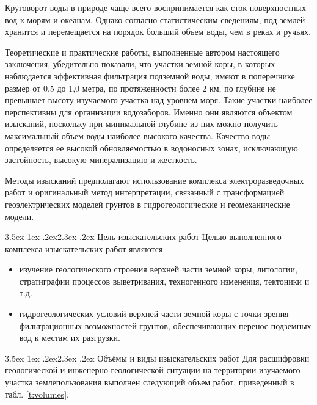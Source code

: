 \documentclass[a4paper,12pt]{article} %
\makeatletter
\renewcommand\section{\@startsection {section}{1}{\parindent}%
	{3.5ex \@plus 1ex \@minus .2ex}{2.3ex \@plus.2ex}%
	{\normalfont\hyphenpenalty=10000\Large\bfseries}}
\makeatother
\begin{document}
Круговорот воды в природе чаще всего воспринимается как сток поверхностных вод к морям и океанам. Однако согласно статистическим сведениям, под землей хранится и перемещается на порядок больший объем воды, чем в реках и ручьях.

Теоретические и практические работы, выполненные автором настоящего заключения, убедительно показали, что участки земной коры, в которых наблюдается эффективная фильтрация подземной воды, имеют в поперечнике размер от 0,5 до 1,0 метра, по протяженности более 2 км, по глубине не превышает высоту изучаемого участка над уровнем моря. Такие участки наиболее перспективны для организации водозаборов. Именно они являются объектом изысканий, поскольку при минимальной глубине из них можно получить максимальный объем воды наиболее высокого качества. Качество воды определяется ее высокой обновляемостью в водоносных зонах, исключающую застойность, высокую минерализацию и жесткость.

Методы изысканий предполагают использование комплекса электроразведочных работ и оригинальный метод интерпретации, связанный с трансформацией геоэлектрических моделей грунтов в гидрогеологические и геомеханические модели.

\section{Цель изыскательских работ}
Целью выполненного комплекса изыскательских работ являются:
\begin{itemize}
	\item изучение геологического строения верхней части земной коры, литологии, стратиграфии процессов выветривания, техногенного изменения, тектоники и т.д.
	\item гидрогеологических условий верхней части земной коры с точки зрения фильтрационных возможностей грунтов, обеспечивающих перенос подземных вод к местам их разгрузки.
\end{itemize}


\section{Объёмы и виды изыскательских работ}
Для расшифровки геологической и инженерно-геологической ситуации на территории изучаемого участка землепользования выполнен следующий объем работ, приведенный в табл. {\ref{t:volumes}}.
\end{document}
